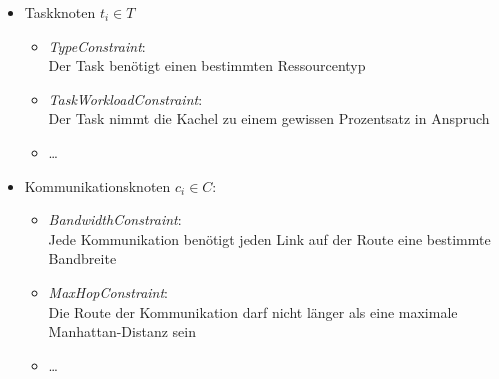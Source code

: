 \begin{itemize}
\item Taskknoten $t_i\in T$
\begin{itemize}
\item \textit{TypeConstraint}: \\
Der Task benötigt einen bestimmten Ressourcentyp
\item \textit{TaskWorkloadConstraint}: \\
Der Task nimmt die  Kachel zu einem gewissen Prozentsatz in Anspruch
\item \dots 
\label{Taskknoten}
\end{itemize}
\item Kommunikationsknoten $c_i \in C$:
\begin{itemize}
\item \textit{BandwidthConstraint}: \\
Jede Kommunikation benötigt jeden Link auf der Route eine bestimmte Bandbreite
\item \textit{MaxHopConstraint}: \\
Die Route der Kommunikation darf nicht länger als eine maximale Manhattan-Distanz sein
\item \dots
\label{Kommunikationsknoten}
\end{itemize}

\label{Randbedingungen}

\end{itemize}

